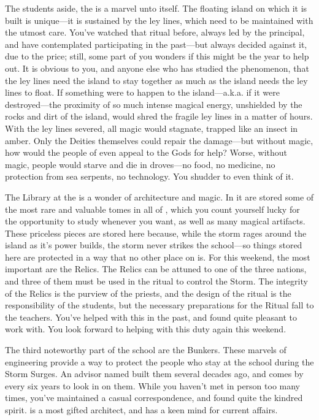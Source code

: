 \documentclass[char]{GL2020}
\begin{document}
The students aside, the \pSc{} is a marvel unto itself. The floating island on which it is built is unique---it is sustained by the ley lines, which need to be maintained with the utmost care. You've watched that ritual before, always led by the principal, and have contemplated participating in the past---but always decided against it, due to the price; still, some part of you wonders if this might be the year to help out. It is obvious to you, and anyone else who has studied the phenomenon, that the ley lines need the island to stay together as much as the island needs the ley lines to float. If something were to happen to the island---a.k.a. if it were destroyed---the proximity of so much intense magical energy, unshielded by the rocks and dirt of the island, would shred the fragile ley lines in a matter of hours. With the ley lines severed, all magic would stagnate, trapped like an insect in amber. Only the Deities themselves could repair the damage---but without magic, how would the people of \pEarth{} even appeal to the Gods for help? Worse, without magic, people would starve and die in droves---no food, no medicine, no protection from sea serpents, no technology. You shudder to even think of it.

The Library at the \pSc{} is a wonder of architecture and magic. In it are stored some of the most rare and valuable tomes in all of \pEarth{}, which you count yourself lucky for the opportunity to study whenever you want, as well as many magical artifacts. These priceless pieces are stored here because, while the storm rages around the island as it's power builds, the storm never strikes the school---so things stored here are protected in a way that no other place on \pEarth{} is. For this weekend, the most important are the Relics. The Relics can be attuned to one of the three nations, and three of them must be used in the ritual to control the Storm. The integrity of the Relics is the purview of the priests, and the design of the ritual is the responsibility of the students, but the necessary preparations for the Ritual fall to the teachers. You've helped \cLibrarian{\full} with this in the past, and found \cLibrarian{\them} quite pleasant to work with. You look forward to helping with this duty again this weekend.

The third noteworthy part of the school are the Bunkers. These marvels of engineering provide a way to protect the people who stay at the school during the Storm Surges. An advisor named \cBunker{\full} built them several decades ago, and comes by every six years to look in on them. While you haven't met \cBunker{\them} in person too many times, you've maintained a casual correspondence, and found quite the kindred spirit. \cBunker{} is a most gifted architect, and has a keen mind for current affairs.
\end{document}
